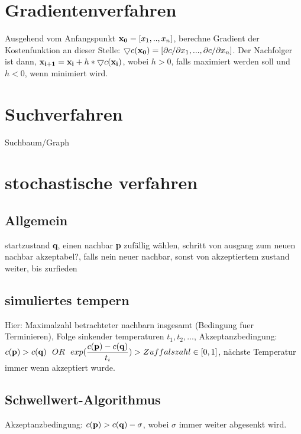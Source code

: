\documentclass[]{scrartcl}
\begin{document}
\setlength{\abovedisplayskip}{0pt}
\setlength{\belowdisplayskip}{0pt}
\setlength{\parskip}{0pt}
\setlength{\topmargin}{0pt}

\thispagestyle{empty}

\section{Gradientenverfahren}
Ausgehend vom Anfangspunkt  $ {\bf x_{0}}  =  [x_{1},..,x_{n}] $, berechne Gradient der Kostenfunktion an dieser Stelle: $ \bigtriangledown c({\bf x_{0}}) = [ \partial c / \partial x_{1} , ... , \partial c / \partial x_{n} ] $. Der Nachfolger ist dann, $ {\bf x_{i+1}} = {\bf x_{i}} + h * \bigtriangledown c({\bf x_{i}}) $, wobei $ h > 0 $, falls maximiert werden soll und $ h < 0 $, wenn minimiert wird.

\section{Suchverfahren}
Suchbaum/Graph

\section{stochastische verfahren}
\subsection{Allgemein}
startzustand \textbf{q}, einen nachbar \textbf{p} zufällig wählen, schritt von ausgang zum neuen nachbar akzeptabel?, falls nein neuer nachbar, sonst von akzeptiertem zustand weiter, bis zurfieden

\subsection{simuliertes tempern}
Hier: Maximalzahl betrachteter nachbarn insgesamt (Bedingung fuer Terminieren), Folge sinkender temperaturen $ t_{1}, t_{2}, ... $, Akzeptanzbedingung:\\
$ c({\bf p}) > c({\bf q}) \ \ OR \ \ exp(\dfrac{c({\bf p}) - c({\bf q})}{t_{i}}) > Zuffalszahl \in [0,1] $, nächste Temperatur immer wenn akzeptiert wurde.

\subsection{Schwellwert-Algorithmus}
Akzeptanzbedingung: $ c({\bf p}) > c({\bf q}) - \sigma $, wobei $ \sigma $ immer weiter abgesenkt wird.
\end{document}
